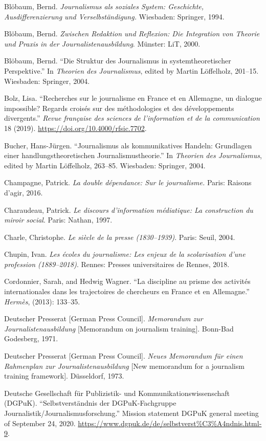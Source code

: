 \documentclass{tufte-handout}
\begin{document}
\begin{hangparas}{.25in}{1}
Blöbaum, Bernd. \emph{Journalismus als soziales System: Geschichte,
Ausdifferenzierung und Verselbständigung.} Wiesbaden: Springer, 1994.

Blöbaum, Bernd. \emph{Zwischen Redaktion und Reflexion: Die Integration
von Theorie und Praxis in der Journalistenausbildung}. Münster: LiT,
2000.

Blöbaum, Bernd. ``Die Struktur des Journalismus in systemtheoretischer
Perspektive.'' In \emph{Theorien des Journalismus}, edited by Martin
Löffelholz, 201--15. Wiesbaden: Springer, 2004.

Bolz, Lisa. ``Recherches sur le journalisme en France et en Allemagne,
un dialogue impossible? Regards croisés sur des méthodologies et des
développements divergents.'' \emph{Revue française des sciences de
l'information et de la communication} 18 (2019).
\url{https://doi.org/10.4000/rfsic.7702}.

Bucher, Hans-Jürgen. ``Journalismus als kommunikatives Handeln:
Grundlagen einer handlungstheoretischen Journalismustheorie.'' In
\emph{Theorien des Journalismus}, edited by Martin Löffelholz, 263--85.
Wiesbaden: Springer, 2004.

Champagne, Patrick. \emph{La double dépendance: Sur le journalisme.}
Paris: Raisons d'agir, 2016.

Charaudeau, Patrick. \emph{Le discours d'information médiatique: La
construction du miroir social}. Paris: Nathan, 1997.

Charle, Christophe. \emph{Le siècle de la presse (1830--1939)}. Paris:
Seuil, 2004.

Chupin, Ivan. \emph{Les écoles du journalisme: Les enjeux de la
scolarisation d'une profession (1889--2018)}. Rennes: Presses
universitaires de Rennes, 2018.

Cordonnier, Sarah, and Hedwig Wagner. ``La discipline au prisme des
activités internationales dans les trajectoires de chercheurs en France
et en Allemagne.'' \emph{Hermès}, (2013): 133--35.

Deutscher Presserat {[}German Press Council{]}. \emph{Memorandum zur
Journalistenausbildung} {[}Memorandum on journalism training{]}.
Bonn-Bad Godesberg, 1971.

Deutscher Presserat {[}German Press Council{]}. \emph{Neues Memorandum
für einen Rahmenplan zur Journalistenausbildung} {[}New memorandum for a
journalism training framework{]}. Düsseldorf, 1973.

Deutsche Gesellschaft für Publizistik- und Kommunikationswissenschaft
(DGPuK). ``Selbstverständnis der DGPuK-Fachgruppe
Journalistik/Journalismusforschung.'' Mission statement DGPuK general
meeting of September 24, 2020.
\url{https://www.dgpuk.de/de/selbstverst\%C3\%A4ndnis.html-9}.


\end{hangparas}
\end{document}
